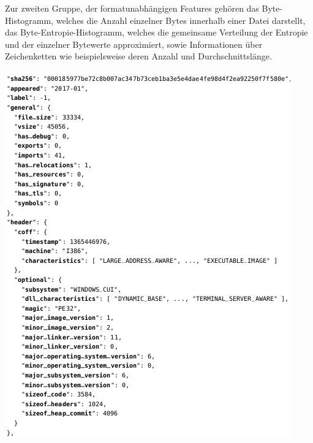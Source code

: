 \documentclass[
    12pt, %
    DIV10,
    ngerman, %
    a4paper, %
    oneside, %
    titlepage, %
    parskip=half, %
    headings=normal, %
    listof=totoc, %
    bibliography=totoc, %
    index=totoc, %
    captions=tableheading, %
    final %
]{scrreprt}
\begin{document}
Zur zweiten Gruppe, der formatunabhängigen Features gehören das Byte-Histogramm, welches die Anzahl einzelner Bytes innerhalb einer Datei darstellt, das Byte-Entropie-Histogramm, welches die gemeinsame Verteilung der Entropie und der einzelner Bytewerte approximiert, sowie Informationen über Zeichenketten wie beispielsweise deren Anzahl und Durchschnittslänge.
\begin{center}
\includegraphics[scale=0.7]{img/ember1.png}
\end{center}
\end{document}
